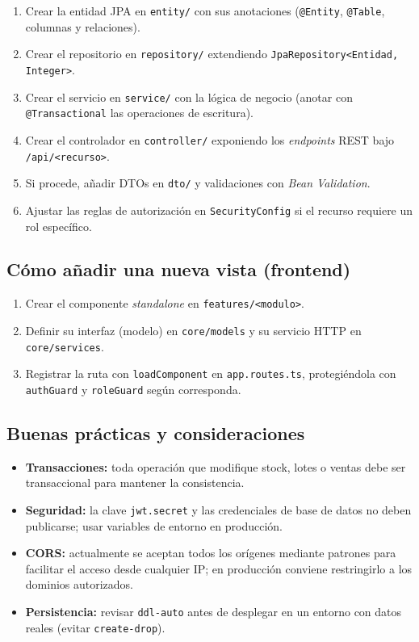 \documentclass[11pt,a4paper]{article}
\begin{document}
\begin{enumerate}[noitemsep]
    \item Crear la entidad JPA en \texttt{entity/} con sus anotaciones
          (\texttt{@Entity}, \texttt{@Table}, columnas y relaciones).
    \item Crear el repositorio en \texttt{repository/} extendiendo
          \texttt{JpaRepository<Entidad, Integer>}.
    \item Crear el servicio en \texttt{service/} con la lógica de negocio
          (anotar con \texttt{@Transactional} las operaciones de escritura).
    \item Crear el controlador en \texttt{controller/} exponiendo los
          \emph{endpoints} REST bajo \texttt{/api/<recurso>}.
    \item Si procede, añadir DTOs en \texttt{dto/} y validaciones con
          \emph{Bean Validation}.
    \item Ajustar las reglas de autorización en \texttt{SecurityConfig} si el
          recurso requiere un rol específico.
\end{enumerate}

\subsection{Cómo añadir una nueva vista (frontend)}

\begin{enumerate}[noitemsep]
    \item Crear el componente \emph{standalone} en \texttt{features/<modulo>}.
    \item Definir su interfaz (modelo) en \texttt{core/models} y su servicio
          HTTP en \texttt{core/services}.
    \item Registrar la ruta con \texttt{loadComponent} en
          \texttt{app.routes.ts}, protegiéndola con \texttt{authGuard} y
          \texttt{roleGuard} según corresponda.
\end{enumerate}

\subsection{Buenas prácticas y consideraciones}

\begin{itemize}[noitemsep]
    \item \textbf{Transacciones:} toda operación que modifique stock, lotes o
          ventas debe ser transaccional para mantener la consistencia.
    \item \textbf{Seguridad:} la clave \texttt{jwt.secret} y las credenciales
          de base de datos no deben publicarse; usar variables de entorno en
          producción.
    \item \textbf{CORS:} actualmente se aceptan todos los orígenes mediante
          patrones para facilitar el acceso desde cualquier IP; en producción
          conviene restringirlo a los dominios autorizados.
    \item \textbf{Persistencia:} revisar \texttt{ddl-auto} antes de desplegar
          en un entorno con datos reales (evitar \texttt{create-drop}).
\end{itemize}
\end{document}
